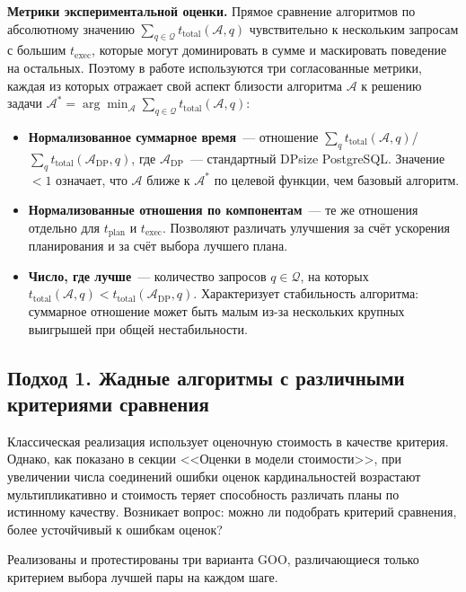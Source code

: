 \textbf{Метрики экспериментальной оценки.}
Прямое сравнение алгоритмов по абсолютному значению
$\sum_{q \in \mathcal{Q}} t_{\mathrm{total}}(\mathcal{A}, q)$
чувствительно к нескольким запросам с большим $t_{\mathrm{exec}}$,
которые могут доминировать в сумме и маскировать поведение на остальных.
Поэтому в работе используются три согласованные метрики, каждая из которых
отражает свой аспект близости алгоритма $\mathcal{A}$ к решению задачи
$\mathcal{A}^* = \arg\min_{\mathcal{A}} \sum_{q \in \mathcal{Q}} t_{\mathrm{total}}(\mathcal{A}, q)$:
\begin{itemize}
    \item \textbf{Нормализованное суммарное время}~--- отношение
    $\sum_q t_{\mathrm{total}}(\mathcal{A}, q)$/
    $\sum_q t_{\mathrm{total}}(\mathcal{A}_{\mathrm{DP}}, q)$,
    где $\mathcal{A}_{\mathrm{DP}}$~--- стандартный DPsize PostgreSQL.
    Значение $< 1$ означает, что $\mathcal{A}$ ближе к $\mathcal{A}^*$ по целевой функции,
    чем базовый алгоритм.

    \item \textbf{Нормализованные отношения по компонентам}~--- те же отношения
    отдельно для $t_{\mathrm{plan}}$ и $t_{\mathrm{exec}}$.
    Позволяют различать улучшения за счёт ускорения планирования
    и за счёт выбора лучшего плана.

    \item \textbf{Число, где лучше}~--- количество запросов $q \in \mathcal{Q}$,
    на которых $t_{\mathrm{total}}(\mathcal{A}, q) < t_{\mathrm{total}}(\mathcal{A}_{\mathrm{DP}}, q)$.
    Характеризует стабильность алгоритма: суммарное отношение может быть
    малым из-за нескольких крупных выигрышей при общей нестабильности.
\end{itemize}

\subsection{Подход 1. Жадные алгоритмы с различными критериями сравнения}

Классическая реализация использует оценочную стоимость в качестве критерия.
Однако, как показано в секции <<Оценки в модели стоимости>>,
при увеличении числа соединений ошибки оценок кардинальностей
возрастают мультипликативно и стоимость теряет способность
различать планы по истинному качеству.
Возникает вопрос: можно ли подобрать критерий сравнения,
более усточйчивый к ошибкам оценок?
\par

Реализованы и протестированы три варианта GOO, различающиеся
только критерием выбора лучшей пары на каждом шаге.
\par

